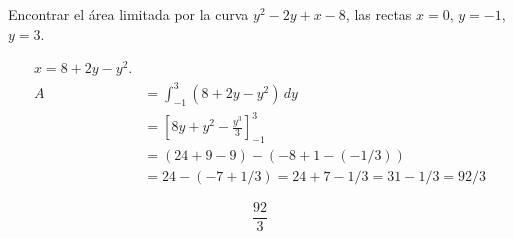 Encontrar el área limitada por la curva $y^2-2y+x-8$, las rectas $x=0$, $y=-1$, $y=3$.

\nopagebreak
\begin{align*}
x = 8 + 2y - y^2. \\
A &= \int_{-1}^{3} (8 + 2y - y^2) \, dy \\
&= \left[ 8y + y^2 - \frac{y^3}{3} \right]_{-1}^{3} \\
&= (24 + 9 - 9) - (-8 + 1 - (-1/3)) \\
&= 24 - (-7 + 1/3) = 24 + 7 - 1/3 = 31 - 1/3 = 92/3
\end{align*}

\[
\boxed{\displaystyle \frac{92}{3}}
\]
